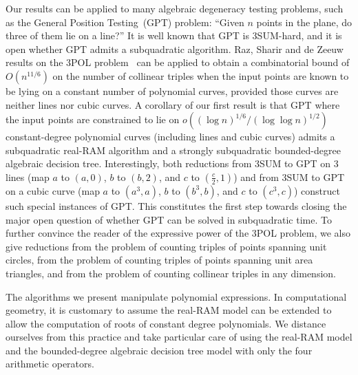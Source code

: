 Our results can be applied to many algebraic degeneracy testing problems, such
as the General Position Testing~(GPT) problem: ``Given $n$ points in the plane, do
three of them lie on a line?'' It is well known that GPT is 3SUM-hard,
and it is open whether GPT admits a subquadratic algorithm. Raz, Sharir
and de Zeeuw results on the 3POL problem~\cite{RSZ15} can be applied to obtain
a combinatorial bound of $O(n^{11/6})$ on the
number of collinear triples when the input points are known to be lying on
a constant number of polynomial curves, provided those curves are neither
lines nor cubic curves. A corollary of our first result is that
GPT where the input points are constrained to lie on
$o({(\log n)}^{1/6}/{(\log \log n)}^{1/2})$
constant-degree polynomial curves (including lines and cubic curves)
admits a subquadratic real-RAM algorithm and
a strongly subquadratic bounded-degree algebraic decision tree.
Interestingly, both reductions from 3SUM to GPT on 3 lines (map $a$ to $(a,0)$,
$b$ to $(b,2)$, and $c$ to $(\frac c2, 1)$) and from 3SUM to GPT on a
cubic curve (map $a$ to $(a^3,a)$, $b$ to $(b^3,b)$, and $c$ to $(c^3,c)$)
construct such special instances of GPT\@.
This constitutes the first step towards closing the major open question of
whether GPT can be solved in subquadratic time.
%
To further convince the reader of the expressive power of the 3POL problem,
we also give reductions from the problem of counting triples of points spanning
unit circles, from the problem of counting triples of points spanning unit area
triangles, and from the problem of counting collinear triples in any dimension.

The algorithms we present manipulate polynomial expressions.
%
In computational geometry, it is customary to assume the real-RAM model can be
extended to allow the computation of roots of constant degree polynomials.
We distance ourselves from this practice and take particular care
of using the real-RAM model and the bounded-degree algebraic decision tree
model with only the four arithmetic operators.
